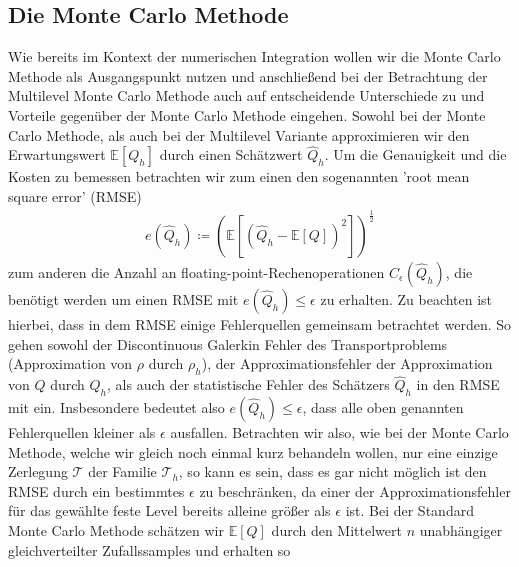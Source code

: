 \subsection{Die Monte Carlo Methode}
Wie bereits im Kontext der numerischen Integration wollen wir die Monte Carlo Methode als Ausgangspunkt nutzen und anschließend bei der Betrachtung der Multilevel Monte Carlo Methode auch auf entscheidende Unterschiede zu und Vorteile gegenüber der Monte Carlo Methode eingehen.
Sowohl bei der Monte Carlo Methode, als auch bei der Multilevel Variante approximieren wir den Erwartungswert $ \mathbb{E}[Q_h] $ durch einen Schätzwert $ \widehat{Q}_h $. Um die Genauigkeit und die Kosten zu bemessen betrachten wir zum einen den sogenannten 'root mean square error' (RMSE) 
\begin{align}
	\label{RMSE}
	e( \widehat{Q}_h) \coloneqq \left(  \mathbb{E} \left[ (\widehat{Q}_h - \mathbb{E}[Q] )^2 \right] \right)^{\frac{1}{2}}
\end{align}
zum anderen die Anzahl an floating-point-Rechenoperationen $ C_{\epsilon}(\widehat{Q}_h) $, die benötigt werden um einen RMSE mit $ e( \widehat{Q}_h) \leq \epsilon $ zu erhalten.
Zu beachten ist hierbei, dass in dem RMSE einige Fehlerquellen gemeinsam betrachtet werden. So gehen sowohl der Discontinuous Galerkin Fehler des Transportproblems (Approximation von $ \rho $ durch $ \rho_h $), der Approximationsfehler der Approximation von $ Q $ durch $ Q_h $, als auch der statistische Fehler des Schätzers $\widehat{Q}_h$ in den RMSE mit ein. Insbesondere bedeutet also $ e( \widehat{Q}_h) \leq \epsilon $, dass alle oben genannten Fehlerquellen kleiner als $ \epsilon $ ausfallen. Betrachten wir also, wie bei der Monte Carlo Methode, welche wir gleich noch einmal kurz behandeln wollen, nur eine einzige Zerlegung $ \mathcal{T} $ der Familie $ \mathcal{T}_h $, so kann es sein, dass es gar nicht möglich ist den RMSE durch ein bestimmtes $ \epsilon $ zu beschränken, da einer der Approximationsfehler für das gewählte feste Level bereits alleine größer als $ \epsilon $ ist. 
Bei der Standard Monte Carlo Methode schätzen wir $ \mathbb{E}[Q] $ durch den Mittelwert  $ n $ unabhängiger gleichverteilter Zufallssamples und erhalten so 
